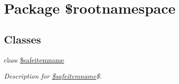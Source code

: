 \hypertarget{namespace_0Brootnamespace}{\section{Package \$rootnamespace}
\label{namespace_0Brootnamespace}
}
\subsection*{Classes}
\begin{DoxyCompactItemize}
\item 
class \hyperlink{class_0Brootnamespace_1_1_0Bsafeitemname}{\$safeitemname}
\begin{DoxyCompactList}\small\item\em Description for \hyperlink{class_0Brootnamespace_1_1_0Bsafeitemname}{\$safeitemname}\$. \end{DoxyCompactList}\end{DoxyCompactItemize}
